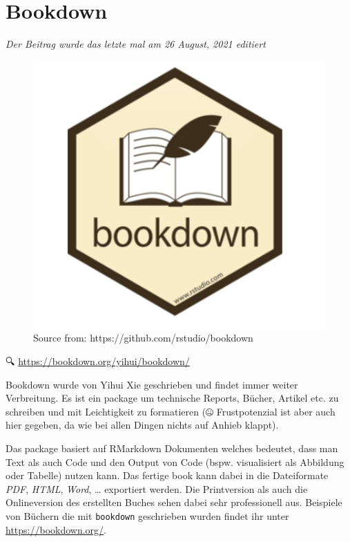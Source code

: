 \documentclass[
]{article}
\begin{document}
\hypertarget{bookdown}{%
\section{Bookdown}\label{bookdown}}

\emph{Der Beitrag wurde das letzte mal am 26 August, 2021 editiert}

\begin{figure}

{\centering \includegraphics[width=1\linewidth]{images/065} 

}

\caption{Source from: https://github.com/rstudio/bookdown}\label{fig:unnamed-chunk-306}
\end{figure}

🔍 \url{https://bookdown.org/yihui/bookdown/}

Bookdown wurde von Yihui Xie geschrieben und findet immer weiter Verbreitung. Es ist ein package um technische Reports, Bücher, Artikel etc. zu schreiben und mit Leichtigkeit zu formatieren (🤐 Frustpotenzial ist aber auch hier gegeben, da wie bei allen Dingen nichts auf Anhieb klappt).

Das package basiert auf RMarkdown Dokumenten welches bedeutet, dass man Text als auch Code und den Output von Code (bspw. visualisiert als Abbildung oder Tabelle) nutzen kann. Das fertige book kann dabei in die Dateiformate \emph{PDF}, \emph{HTML}, \emph{Word}, \ldots{} exportiert werden. Die Printversion als auch die Onlineversion des erstellten Buches sehen dabei sehr professionell aus. Beispiele von Büchern die mit \texttt{bookdown} geschrieben wurden findet ihr unter \url{https://bookdown.org/}.
\end{document}

